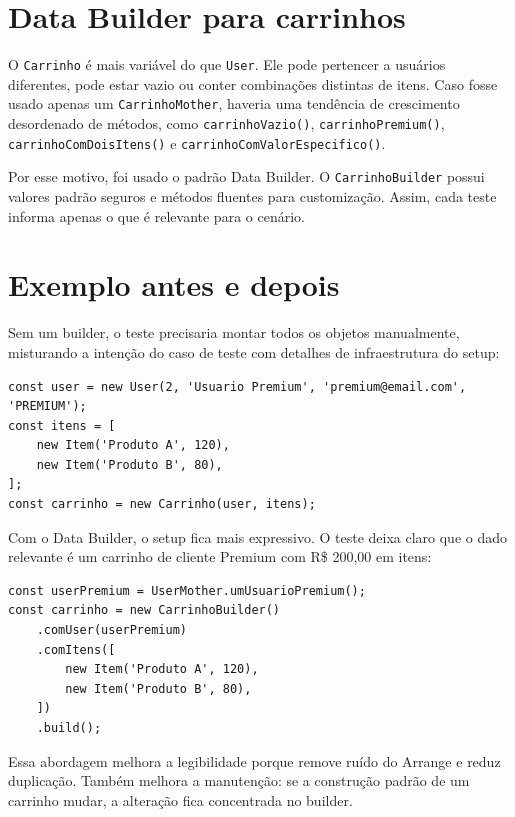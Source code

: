 \documentclass[
    12pt,
    openright,
    oneside,
    a4paper,
    chapter=TITLE,
    section=TITLE,
    brazil,
]{abntex2}
\begin{document}
\section{Data Builder para carrinhos}

O \texttt{Carrinho} \'e mais vari\'avel do que \texttt{User}. Ele pode pertencer a usu\'arios diferentes, pode estar vazio ou conter combina\c{c}\~oes distintas de itens. Caso fosse usado apenas um \texttt{CarrinhoMother}, haveria uma tend\^encia de crescimento desordenado de m\'etodos, como \texttt{carrinhoVazio()}, \texttt{carrinhoPremium()}, \texttt{carrinhoComDoisItens()} e \texttt{carrinhoComValorEspecifico()}.

Por esse motivo, foi usado o padr\~ao Data Builder. O \texttt{CarrinhoBuilder} possui valores padr\~ao seguros e m\'etodos fluentes para customiza\c{c}\~ao. Assim, cada teste informa apenas o que \'e relevante para o cen\'ario.

\section{Exemplo antes e depois}

Sem um builder, o teste precisaria montar todos os objetos manualmente, misturando a inten\c{c}\~ao do caso de teste com detalhes de infraestrutura do setup:

\begin{lstlisting}[style=javascript,caption={Setup manual sem builder}]
const user = new User(2, 'Usuario Premium', 'premium@email.com', 'PREMIUM');
const itens = [
    new Item('Produto A', 120),
    new Item('Produto B', 80),
];
const carrinho = new Carrinho(user, itens);
\end{lstlisting}

Com o Data Builder, o setup fica mais expressivo. O teste deixa claro que o dado relevante \'e um carrinho de cliente Premium com R\$ 200,00 em itens:

\begin{lstlisting}[style=javascript,caption={Setup com CarrinhoBuilder}]
const userPremium = UserMother.umUsuarioPremium();
const carrinho = new CarrinhoBuilder()
    .comUser(userPremium)
    .comItens([
        new Item('Produto A', 120),
        new Item('Produto B', 80),
    ])
    .build();
\end{lstlisting}

Essa abordagem melhora a legibilidade porque remove ru\'ido do Arrange e reduz duplica\c{c}\~ao. Tamb\'em melhora a manuten\c{c}\~ao: se a constru\c{c}\~ao padr\~ao de um carrinho mudar, a altera\c{c}\~ao fica concentrada no builder.
\end{document}
